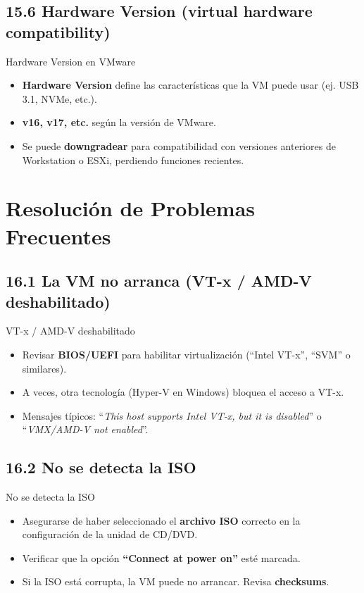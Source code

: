 \documentclass{beamer}
\begin{document}
\subsection{15.6 Hardware Version (virtual hardware compatibility)}
\begin{frame}{Hardware Version en VMware}
    \begin{itemize}
        \item \textbf{Hardware Version} define las características que la VM puede usar (ej. USB 3.1, NVMe, etc.).
        \item \textbf{v16, v17, etc.} según la versión de VMware.
        \item Se puede \textbf{downgradear} para compatibilidad con versiones anteriores de Workstation o ESXi, perdiendo funciones recientes.
    \end{itemize}
\end{frame}

\section{Resolución de Problemas Frecuentes}

\subsection{16.1 La VM no arranca (VT-x / AMD-V deshabilitado)}
\begin{frame}{VT-x / AMD-V deshabilitado}
    \begin{itemize}
        \item Revisar \textbf{BIOS/UEFI} para habilitar virtualización (“Intel VT-x”, “SVM” o similares).
        \item A veces, otra tecnología (Hyper-V en Windows) bloquea el acceso a VT-x.
        \item Mensajes típicos: “\textit{This host supports Intel VT-x, but it is disabled}” o “\textit{VMX/AMD-V not enabled}”.
    \end{itemize}
\end{frame}

\subsection{16.2 No se detecta la ISO}
\begin{frame}{No se detecta la ISO}
    \begin{itemize}
        \item Asegurarse de haber seleccionado el \textbf{archivo ISO} correcto en la configuración de la unidad de CD/DVD.
        \item Verificar que la opción \textbf{“Connect at power on”} esté marcada.
        \item Si la ISO está corrupta, la VM puede no arrancar. Revisa \textbf{checksums}.
    \end{itemize}
\end{frame}
\end{document}
